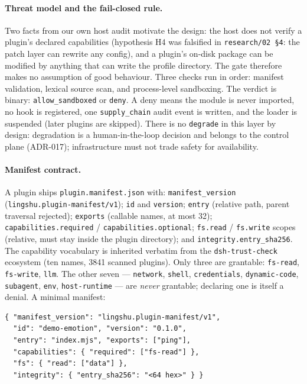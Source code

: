 \paragraph{Threat model and the fail-closed rule.}
Two facts from our own host audit motivate the design: the host does not
verify a plugin's declared capabilities (hypothesis H4 was falsified in
\texttt{research/02 \S4}: the patch layer can rewrite any config), and a
plugin's on-disk package can be modified by anything that can write the
profile directory. The gate therefore makes no assumption of good behaviour.
Three checks run in order: manifest validation, lexical source scan, and
process-level sandboxing. The verdict is binary: \texttt{allow\_sandboxed} or
\texttt{deny}. A deny means the module is never imported, no hook is
registered, one \texttt{supply\_chain} audit event is written, and the loader
is suspended (later plugins are skipped). There is no \texttt{degrade} in this
layer by design: degradation is a human-in-the-loop decision and belongs to
the control plane (ADR-017); infrastructure must not trade safety for
availability.

\paragraph{Manifest contract.}
A plugin ships \texttt{plugin.manifest.json} with: \texttt{manifest\_version}
(\texttt{lingshu.plugin-manifest/v1}); \texttt{id} and \texttt{version};
\texttt{entry} (relative path, parent traversal rejected); \texttt{exports}
(callable names, at most 32); \texttt{capabilities.required} /
\texttt{capabilities.optional}; \texttt{fs.read} / \texttt{fs.write} scopes
(relative, must stay inside the plugin directory); and
\texttt{integrity.entry\_sha256}. The capability vocabulary is inherited
verbatim from the \texttt{dsh-trust-check} ecosystem (ten names, 3841 scanned
plugins). Only three are grantable: \texttt{fs-read}, \texttt{fs-write},
\texttt{llm}. The other seven --- \texttt{network}, \texttt{shell},
\texttt{credentials}, \texttt{dynamic-code}, \texttt{subagent},
\texttt{env}, \texttt{host-runtime} --- are \emph{never} grantable; declaring
one is itself a denial. A minimal manifest:

{\footnotesize\begin{verbatim}
{ "manifest_version": "lingshu.plugin-manifest/v1",
  "id": "demo-emotion", "version": "0.1.0",
  "entry": "index.mjs", "exports": ["ping"],
  "capabilities": { "required": ["fs-read"] },
  "fs": { "read": ["data"] },
  "integrity": { "entry_sha256": "<64 hex>" } }
\end{verbatim}}

